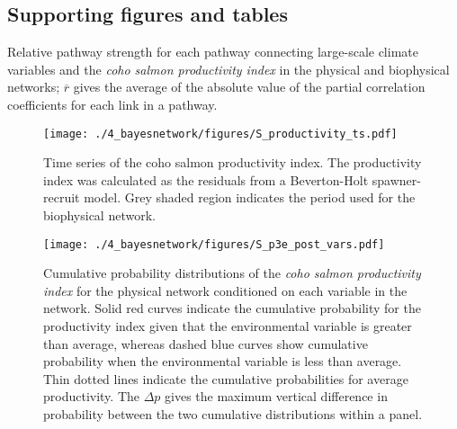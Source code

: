 \subsection{Supporting figures and tables}

\begin{table}[htbp]
  \small \centering \libertineLF
  \caption[Relative pathway strength for each pathway connecting large-scale
           climate variables and the coho salmon productivity index]{Relative
           pathway strength for each pathway connecting large-scale climate
           variables and the \emph{coho salmon productivity index} in the
           physical and biophysical networks; $\overline{r}$ gives the average
           of the absolute value of the partial correlation coefficients for
           each link in a pathway.}
  
  \label{tab:bn:s1}
\end{table}
\clearpage %



\begin{figure}[htbp]
  \centering \texttt{[image: ./4\_bayesnetwork/figures/S\_productivity\_ts.pdf]}
  \caption[Time series of the coho salmon productivity index]{Time series of
           the coho salmon productivity index. The productivity index was
           calculated as the residuals from a Beverton-Holt spawner-recruit
           model. Grey shaded region indicates the period used for the
           biophysical network.}
  \label{fig:bn:s1}
\end{figure}

\begin{figure}[htbp]
  \centering \texttt{[image: ./4\_bayesnetwork/figures/S\_p3e\_post\_vars.pdf]}
  \caption[Cumulative probability distributions of the coho salmon
           productivity index for the physical network conditioned on each
           variable in the network]{Cumulative probability distributions of the
           \emph{coho salmon productivity index} for the physical network
           conditioned on each variable in the network. Solid red curves
           indicate the cumulative probability for the productivity index given
           that the environmental variable is greater than average, whereas
           dashed blue curves show cumulative probability when the
           environmental variable is less than average. Thin dotted lines
           indicate the cumulative probabilities for average productivity. The
           \(\Delta p\) gives the maximum vertical difference in probability
           between the two cumulative distributions within a panel.}
  \label{fig:bn:s2}
\end{figure}

